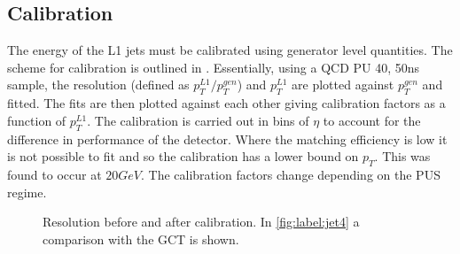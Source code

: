 \subsection{Calibration}
The energy of the L1 jets must be calibrated using generator level quantities. The scheme for calibration is outlined in \cite{l1jet_calibration}. Essentially, using a QCD PU 40, 50ns sample, the resolution (defined as $p^{L1}_{T}/p^{gen}_{T}$) and $p^{L1}_{T}$ are plotted against $p^{gen}_{T}$ and fitted. The fits are then plotted against each other giving calibration factors as a function of $p^{L1}_{T}$. The calibration is carried out in bins of $\eta$ to account for the difference in performance of the detector. Where the matching efficiency is low it is not possible to fit and so the calibration has a lower bound on $p_T$. This was found to occur at $20GeV$. The calibration factors change depending on the PUS regime.    
\begin{figure}
\hfill
{}
\hfill
{}
\hfill
\caption{Resolution before and after calibration. In \ref{fig:label:jet4} a comparison with the GCT is shown.}
\label{match}
\end{figure}
